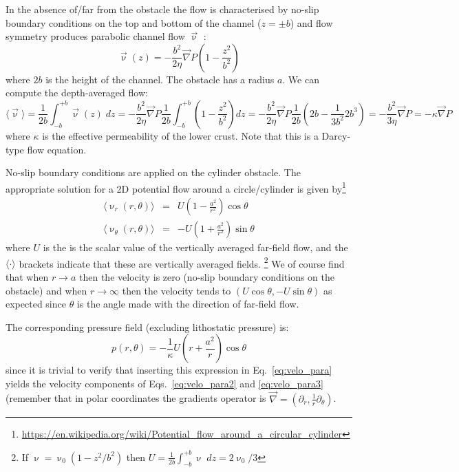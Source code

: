 In the absence of/far from the obstacle the flow is characterised by no-slip boundary conditions 
on the top and bottom of the channel ($z=\pm b$) and flow symmetry produces parabolic channel flow $\vec\upnu$ :
\begin{equation}
\vec\upnu(z) = -\frac{b^2}{2\eta} \vec\nabla P \left( 1 - \frac{z^2}{b^2} \right)
\end{equation}
where $2b$ is the height of the channel. The obstacle has a radius $a$. We can compute the depth-averaged flow:
\begin{equation}
\langle \vec\upnu \rangle = \frac{1}{2b} \int_{-b}^{+b} \vec\upnu(z) \; dz 
=-\frac{b^2}{2\eta} \vec\nabla P \frac{1}{2b} 
\int_{-b}^{+b}   \left( 1 - \frac{z^2}{b^2} \right) dz
= -\frac{b^2}{2\eta} \vec\nabla P \frac{1}{2b} 
\left( 2b - \frac{1}{3b^2} 2b^3 \right)
= - \frac{b^2}{3\eta} \vec\nabla P 
= -\kappa \vec\nabla P
\label{eq:velo_para}
\end{equation}
where $\kappa$ is the effective permeability of the lower crust. 
Note that this is a Darcy-type flow equation.

No-slip boundary conditions are applied on the cylinder obstacle.
The appropriate solution for a 2D potential flow around a circle/cylinder is given by\footnote{\url{https://en.wikipedia.org/wiki/Potential_flow_around_a_circular_cylinder}}
\begin{eqnarray}
\langle\upnu_r(r,\theta)\rangle &=& U \left(1 -\frac{a^2}{r^2} \right) \cos \theta \label{eq:velo_para2}\\
\langle\upnu_\theta(r,\theta)\rangle &=& -U \left(1 +\frac{a^2}{r^2} \right) \sin \theta \label{eq:velo_para3}
\end{eqnarray}
where $U$ is the is the scalar value of the vertically averaged far-field flow, and the $\langle \cdot \rangle$
brackets indicate that these are vertically averaged fields.
\footnote{
If $\upnu = \upnu_0 (1-z^2/b^2)$ then 
$U=\frac{1}{2b} \int_{-b}^{+b} \upnu \; dz = 2\upnu_0/3$}
We of course find that when $r\rightarrow a$ then the velocity is zero 
(no-slip boundary conditions on the obstacle) and when $r\rightarrow \infty$ then the velocity tends to 
$(U \cos\theta, -U \sin\theta)$ as expected since $\theta$ is the angle made with the direction of far-field flow. 

The corresponding pressure field (excluding lithostatic pressure) is: 
\[
p(r,\theta) = -\frac{1}{\kappa} U \left( r  + \frac{a^2}{r}  \right)\cos \theta
\]
since it is trivial to verify that inserting this expression in Eq.~\eqref{eq:velo_para} yields the velocity components of Eqs.~\eqref{eq:velo_para2} and \eqref{eq:velo_para3} (remember that in polar coordinates the gradients operator is $\vec\nabla=(\partial_r , \frac{1}{r} \partial_\theta)$.

